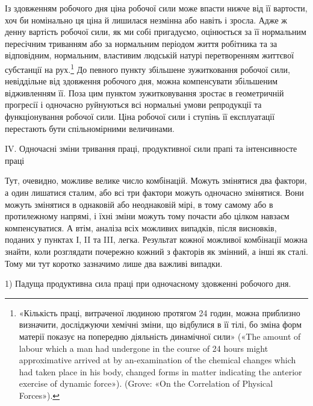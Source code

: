 Із здовженням робочого дня ціна робочої сили може впасти
нижче від її вартости, хоч би номінально ця ціна й лишилася
незмінна або навіть і зросла. Адже ж денну вартість робочої сили,
як ми собі пригадуємо, оцінюється за її нормальним пересічним
триванням або за нормальним періодом життя робітника та за
відповідним, нормальним, властивим людській натурі перетворенням
життєвої субстанції на рух.\footnote{
«Кількість праці, витраченої людиною протягом 24 годин, можна
приблизно визначити, досліджуючи хемічні зміни, що відбулися в її
тілі, бо зміна форм матерії показує на попередню діяльність динамічної
сили» («The amount of labour which a man had undergone in the course
of 24 hours might approximative arrived at by an-examination of the
chemical changes which had taken place in his body, changed forms in
matter indicating the anterior exercise of dynamic force»). (Grove: «On
the Correlation of Physical Forces»).
} До певного пункту збільшене
зужитковання робочої сили, невіддільне від здовження
робочого дня, можна компенсувати збільшеним відживленням її.
Поза цим пунктом зужитковування зростає в геометричній прогресії
і одночасно руйнуються всі нормальні умови репродукції
та функціонування робочої сили. Ціна робочої сили і ступінь
її експлуатації перестають бути спільномірними величинами.

IV. Одночасні зміни тривання праці, продуктивної сили прапі
та інтенсивносте праці

Тут, очевидно, можливе велике число комбінацій. Можуть
змінятися два фактори, а один лишатися сталим, або всі три фактори
можуть одночасно змінятися. Вони можуть змінятися в
однаковій або неоднаковій мірі, в тому самому або в протилежному
напрямі, і їхні зміни можуть тому почасти або цілком
навзаєм компенсуватися. А втім, аналіза всіх можливих випадків,
після висновків, поданих у пунктах І, II та III, легка. Результат
кожної можливої комбінації можна знайти, коли розглядати
почережно кожний з факторів як змінний, а інші як сталі.
Тому ми тут коротко зазначимо лише два важливі випадки.

1) Падуща продуктивна сила праці при одночасному здовженні
робочого дня.

